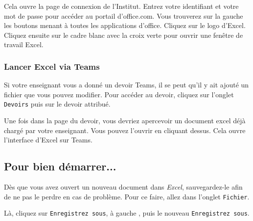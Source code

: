Cela ouvre la page de connexion de l'Institut. Entrez votre identifiant et votre mot de passe pour accéder au portail d'office.com. Vous trouverez sur la gauche les boutons menant à toutes les applications d'office. Cliquez sur le logo d'Excel. Cliquez ensuite sur le cadre blanc avec la croix verte pour ouvrir une fenêtre de travail Excel.


\subsubsection{Lancer Excel via Teams}

Si votre enseignant vous a donné un devoir Teams, il se peut qu'il y ait ajouté un fichier que vous pouvez modifier. Pour accéder au devoir, cliquez sur l'onglet \texttt{Devoirs}  puis sur le devoir attribué. 


Une fois dans la page du devoir, vous devriez apercevoir un document excel déjà chargé par votre enseignant. Vous pouvez l'ouvrir en cliquant dessus. Cela ouvre l'interface d'Excel sur Teams.



%
%
%
%


\subsection{Pour bien démarrer...}

Dès que vous avez ouvert un nouveau document dans \emph{Excel}, sauvegardez-le afin de ne pas le perdre en cas de problème. Pour ce faire, allez dans l'onglet \texttt{Fichier}. 


Là, cliquez sur \texttt{Enregistrez sous}, à gauche , puis le nouveau \texttt{Enregistrez sous}. 

